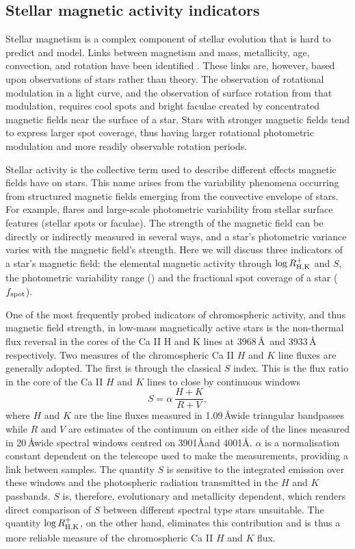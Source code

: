 \subsection*{Stellar magnetic activity indicators}
\label{sec:act_ind}

Stellar magnetism is a complex component of stellar evolution that is hard to predict and model.
Links between magnetism and mass, metallicity, age, convection, and rotation have been identified \citep{cao_starspots_2022}.
These links are, however, based upon observations of stars rather than theory.
The observation of rotational modulation in a light curve, and the observation of surface rotation from that modulation, requires cool spots and bright faculae created by concentrated magnetic fields near the surface of a star.
Stars with stronger magnetic fields tend to express larger spot coverage, thus having larger rotational photometric modulation and more readily observable rotation periods.

Stellar activity is the collective term used to describe different effects magnetic fields have on stars.
This name arises from the variability phenomena occurring from structured magnetic fields emerging from the convective envelope of stars.
For example, flares and large-scale photometric variability from stellar surface features (stellar spots or faculae).
The strength of the magnetic field can be directly or indirectly measured in several ways, and a star's photometric variance varies with the magnetic field's strength.
Here we will discuss three indicators of a star's magnetic field: the elemental magnetic activity through $\log R^{+}_{\rm{H,K}}$ and $S$, the photometric variability range (\rper) and the fractional spot coverage of a star ($f_{\rm{spot}}$).

One of the most frequently probed indicators of chromospheric activity, and thus magnetic field strength, in low-mass magnetically active stars is the non-thermal flux reversal in the cores of the Ca II H and K lines at 3968\,\AA\ and 3933\,\AA\, respectively.
Two measures of the chromospheric Ca II $H$ and $K$ line fluxes are generally adopted.
The first is through the classical $S$ index.
This is the flux ratio in the core of the Ca II $H$ and $K$ lines to close by continuous windows
\begin{equation}
S = \alpha \ \frac{H+K}{R+V},
\end{equation}
where $H$ and $K$ are the line fluxes measured in 1.09\,\AA\-wide triangular bandpasses while $R$ and $V$ are estimates of the continuum on either side of the lines measured in 20\,\AA\-wide spectral windows centred on 3901\AA and 4001\AA. 
$\alpha$ is a normalisation constant dependent on the telescope used to make the measurements, providing a link between samples.
The quantity $S$ is sensitive to the integrated emission over these windows and the photospheric radiation transmitted in the $H$ and $K$ passbands. 
$S$ is, therefore, evolutionary and metallicity dependent, which renders direct comparison of $S$ between different spectral type stars unsuitable.
The quantity $\log R^{+}_{\rm{H,K}}$, on the other hand, eliminates this contribution \citep[see, e.g. ][]{lorenzo_solar_2018} and is thus a more reliable measure of the chromospheric Ca II $H$ and $K$ flux.

